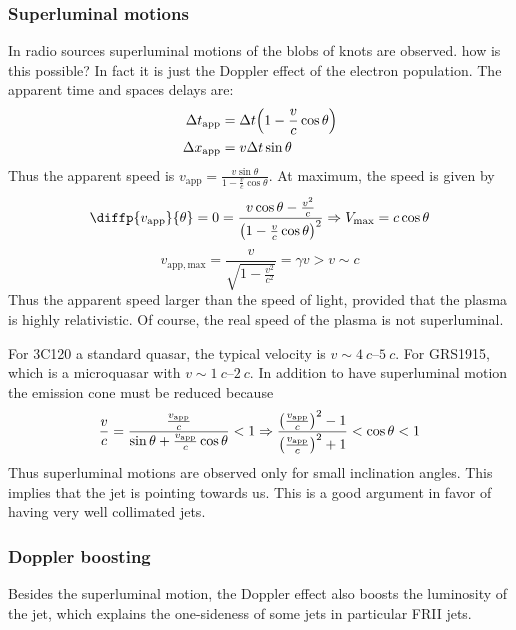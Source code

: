 \documentclass[10pt,a4paper,english]{article}
\let\originalleft\left
\let\originalright\right
\renewcommand{\left}{\mathopen{}\mathclose\bgroup\originalleft}
\renewcommand{\right}{\aftergroup\egroup\originalright}
\begin{document}
\subsubsection{Superluminal motions}
In radio sources superluminal motions of the blobs of knots are
observed. how is this possible? In fact it is just the Doppler effect
of the electron population. The apparent time and spaces delays are:
\begin{align}
  \Delta t_\mathrm{app} & = \Delta t \left( 1 - \frac{v}{c}\cos{\theta}\right)  \\
  \Delta x_\mathrm{app} &= v\Delta t\sin\theta
\end{align}
Thus the apparent speed is
$v_\mathrm{app} = \frac{v\sin\theta}{1 - \frac{v}{c }\cos{\theta}}$. At
maximum, the speed is given by
\begin{equation}
  \diffp{v_\mathrm{app}}{\theta} = 0 = \frac{v\cos{\theta} - \frac{v^2}{c }}{\left( 1 - \frac{v }{c} \cos\theta \right)^2} \Rightarrow V_\mathrm{max} = c\cos{\theta}
\end{equation}
\begin{equation}
  v_\mathrm{app,max} = \frac{v}{\sqrt{1 - \frac{v^2}{c^2}}} = \gamma v > v \sim c
\end{equation}
Thus the apparent speed larger than the speed of light, provided that
the plasma is highly relativistic. Of course, the real speed of the
plasma is not superluminal.

For 3C120 a standard quasar, the typical velocity is
$v\sim \SIrange{4}{5}{c}$. For GRS1915, which is a microquasar with
$v\sim \SIrange{1}{2}{c }$. In addition to have superluminal motion
the emission cone must be reduced because
\begin{equation}
  \frac{v}{c } = \frac{\frac{v_\mathrm{app}}{c}}{\sin\theta + \frac{v_\mathrm{app}}{c}\cos{\theta}} < 1 \Rightarrow \frac{\left( \frac{v_\mathrm{app}}{c} \right)^2 - 1 }{\left( \frac{v_\mathrm{app}}{c } \right)^2 + 1} < \cos{\theta} < 1
\end{equation}
Thus superluminal motions are observed only for small inclination
angles. This implies that the jet is pointing towards us. This is a
good argument in favor of having very well collimated jets.
\subsubsection{Doppler boosting}
Besides the superluminal motion, the Doppler effect also boosts the
luminosity of the jet, which explains the one-sideness of some jets in
particular FRII jets.
\end{document}
